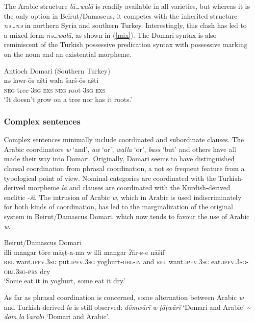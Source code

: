\documentclass[output=paper]{langsci/langscibook}
\begin{document}
The Arabic structure \textit{lā…walā} is readily available in all varieties, but whereas it is the only option in Beirut/Damascus, it competes with the inherited structure \textit{nə…nə} in northern Syria and southern Turkey. Interestingly, this clash has led to a mixed form \textit{nə…walā}, as shown in (\ref{mix}). The Domari syntax is also reminiscent of the Turkish possessive predication syntax with possessive marking on the noun and an existential morpheme.

\ea \label{mix}
{Antioch Domari (Southern Turkey)}\\
\gll nə lawr-ōs ašti wala šarš-ōs ašti\\
     \textsc{neg} tree\textsc{-3sg} \textsc{exs} \textsc{neg} root\textsc{-3sg} \textsc{exs}\\
\glt ‘It doesn’t grow on a tree nor has it roots.’
\z


 \subsubsection{Complex sentences}

Complex sentences minimally include coordinated and subordinate clauses. The Arabic coordinators \textit{w} ‘and’, \textit{aw} ‘or’, \textit{walla} ‘or’, \textit{bass} `but' and others have all made their way into Domari. Originally, Domari seems to have distinguished clausal coordination from phrasal coordination, a not so frequent feature from a typological point of view. Nominal categories are coordinated with the Turkish-derived morpheme \textit{la} and clauses are coordinated with the Kurdish-derived enclitic -\textit{ši}. The intrusion of Arabic \textit{w}, which in Arabic is used indiscriminately for both kinds of coordination, has led to the marginalization of the original system in Beirut/Damascus Domari, which now tends to favour the use of Arabic \textit{w}.

\ea
{Beirut/Damascus Domari}\\
\gll illi mangar tōre māṣṭ-a-ma w illi mangar ʔār-s-e nāšif\\
     \textsc{rel} want.\textsc{ipfv.3sg} put.\textsc{ipfv.3sg} yoghurt-\textsc{obl-in} and \textsc{rel} want.\textsc{ipfv.3sg} eat.\textsc{ipfv.3sg-obj.3sg-prs} dry\\
\glt ‘Some eat it in yoghurt, some eat it dry.’
\z

As far as phrasal coordination is concerned, some alternation between Arabic \textit{w} and Turkish-derived \textit{la} is still observed: \textit{dōmwārī} \textit{w} \textit{ṭāṭwārī} ‘Domari and Arabic’ {\textasciitilde} \textit{dōm} \textit{la} \textit{ʕarabi} ‘Domari and Arabic’.
\end{document}
